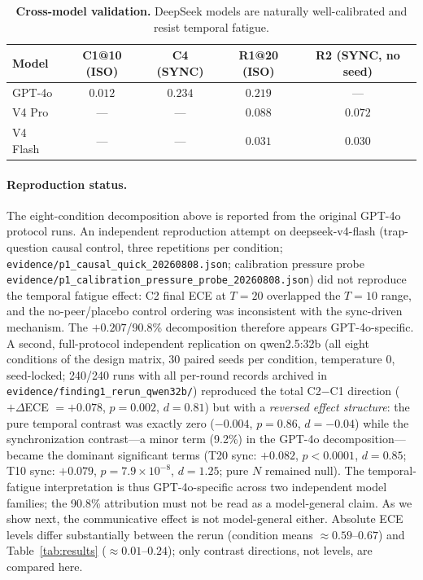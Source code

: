 \documentclass[11pt]{article}
\theoremstyle{definition}
\theoremstyle{remark}
\begin{document}
\begin{table}[H]
\centering
\caption{\textbf{Cross-model validation.} DeepSeek models are naturally well-calibrated and resist temporal fatigue.}
\label{tab:cross}
\begin{tabular}{@{}lcccc@{}}
\toprule
Model & C1@10 (ISO) & C4 (SYNC) & R1@20 (ISO) & R2 (SYNC, no seed) \\
\midrule
GPT-4o & $0.012$ & $0.234$ & $0.219$ & --- \\
V4 Pro & --- & --- & $0.088$ & $0.072$ \\
V4 Flash & --- & --- & $0.031$ & $0.030$ \\
\bottomrule
\end{tabular}
\end{table}

\paragraph{Reproduction status.} The eight-condition decomposition above is reported from the original GPT-4o protocol runs. An independent reproduction attempt on deepseek-v4-flash (trap-question causal control, three repetitions per condition; \texttt{evidence/p1\_causal\_quick\_20260808.json}; calibration pressure probe \texttt{evidence/p1\_calibration\_pressure\_probe\_20260808.json}) did not reproduce the temporal fatigue effect: C2 final ECE at $T{=}20$ overlapped the $T{=}10$ range, and the no-peer/placebo control ordering was inconsistent with the sync-driven mechanism. The $+0.207$/90.8\% decomposition therefore appears GPT-4o-specific. A second, full-protocol independent replication on qwen2.5:32b (all eight conditions of the design matrix, 30 paired seeds per condition, temperature 0, seed-locked; 240/240 runs with all per-round records archived in \texttt{evidence/finding1\_rerun\_qwen32b/}) reproduced the total C2$-$C1 direction ($+\Delta$ECE $= +0.078$, $p = 0.002$, $d = 0.81$) but with a \emph{reversed effect structure}: the pure temporal contrast was exactly zero ($-0.004$, $p = 0.86$, $d = -0.04$) while the synchronization contrast---a minor term (9.2\%) in the GPT-4o decomposition---became the dominant significant terms (T20 sync: $+0.082$, $p < 0.0001$, $d = 0.85$; T10 sync: $+0.079$, $p = 7.9{\times}10^{-8}$, $d = 1.25$; pure $N$ remained null). The temporal-fatigue interpretation is thus GPT-4o-specific across two independent model families; the 90.8\% attribution must not be read as a model-general claim. As we show next, the communicative effect is not model-general either. Absolute ECE levels differ substantially between the rerun (condition means $\approx 0.59$--$0.67$) and Table~\ref{tab:results} ($\approx 0.01$--$0.24$); only contrast directions, not levels, are compared here.
\end{document}
